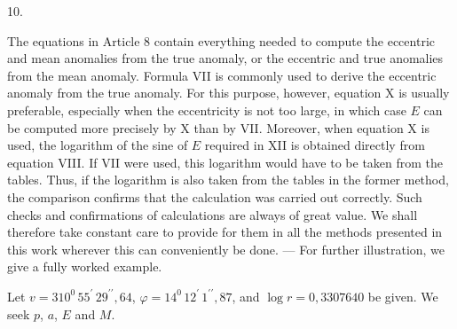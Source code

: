 \par{}
\begin{center}
10.
\end{center}
The equations in Article 8 contain everything needed to compute the eccentric and mean
anomalies from the true anomaly, or the eccentric and true anomalies from the mean
anomaly. Formula VII is commonly used to derive the eccentric anomaly from the true
anomaly. For this purpose, however, equation X is usually preferable, especially when
the eccentricity is not too large, in which case $E$ can be computed more precisely
by X than by VII. Moreover, when equation X is used, the logarithm of the sine of $E$
required in XII is obtained directly from equation VIII. If VII were used, this
logarithm would have to be taken from the tables. Thus, if the logarithm is also
taken from the tables in the former method, the comparison confirms that the calculation
was carried out correctly. Such checks and confirmations of calculations are always
of great value. We shall therefore take constant care to provide for them in all
the methods presented in this work wherever this can conveniently be done.
--- For further illustration, we give a fully worked example.

Let $v = 310^0\,55^{\prime}\,29^{\prime\prime}{,}64$, $\varphi = 14^0\,12^{\prime}\,1^{\prime\prime}{,}87$, and $\log r = 0{,}3307640$ be given. We seek $p$, $a$, $E$ and $M$.

